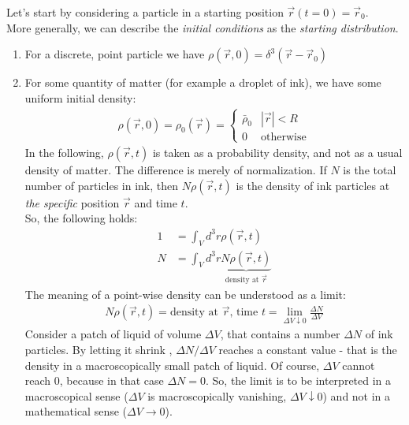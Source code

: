 \documentclass[../template.tex]{subfiles}
\begin{document}
Let's start by considering a particle in a starting position $\vec{r}(t=0)=\vec{r}_0$.\\
More generally, we can describe the \textit{initial conditions} as the \textit{starting distribution}.
\begin{enumerate}
\item For a discrete, point particle we have $\rho(\vec{r},0)=\delta^3(\vec{r}-\vec{r}_0)$
\item For some quantity of matter (for example a droplet of ink), we have some uniform initial density:
\begin{align*}
\rho(\vec{r},0) = \rho_0(\vec{r}) = \begin{cases}
\bar{\rho}_0 & |\vec{r}|<R\\
0 & \text{otherwise}
\end{cases}
\end{align*}
In the following, $\rho(\vec{r},t)$ is taken as a probability density, and not as a usual density of matter. The difference is merely of normalization. If $N$ is the total number of particles in ink, then $N\rho(\vec{r},t)$ is the density of ink particles at \textit{the specific} position $\vec{r}$ and time $t$.\\
So, the following holds:
\begin{align*}
1 &= \int_V d^3r \rho(\vec{r},t)\\
N &= \int_V d^3r \underbrace{N\rho(\vec{r},t)}_{\text{density at $\vec{r}$}}
\end{align*}
The meaning of a point-wise density can be understood as a limit:
\begin{align*}
N \rho(\vec{r},t) = \text{density at $\vec{r}$, time $t$} = \lim_{\Delta V \downarrow 0} \frac{\Delta N}{\Delta V}
\end{align*}
Consider a patch of liquid of volume $\Delta V$, that contains a number $\Delta N$ of ink particles. By letting it shrink , $\Delta N/\Delta V$ reaches a constant value - that is the density in a macroscopically small patch of liquid. Of course, $\Delta V$ cannot reach $0$, because in that case $\Delta N = 0$. So, the limit is to be interpreted in a macroscopical sense ($\Delta V$ is macroscopically vanishing, $\Delta V \downarrow 0$) and not in a mathematical sense ($\Delta V \to 0$).


\end{enumerate}
\end{document}

